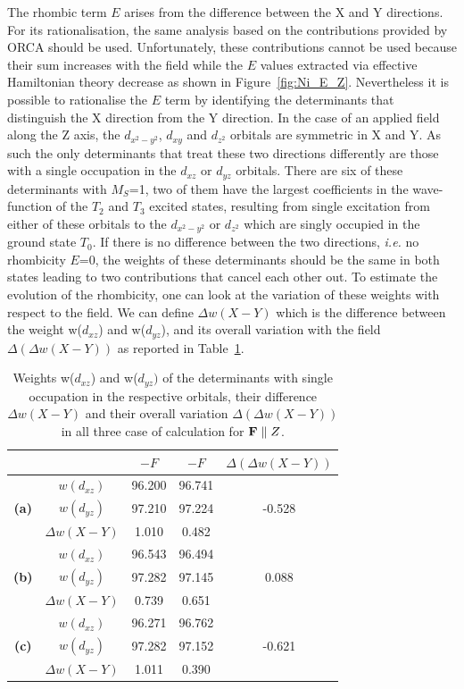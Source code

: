 \documentclass[12pt,a4paper]{report}
\numberwithin{equation}{section}
\begin{document}
The rhombic term $E$ arises from the difference between the X and Y directions. For its rationalisation, the same analysis based on the contributions provided by ORCA should be used.
Unfortunately, these contributions cannot be used because their sum increases with the field while the $E$ values extracted via effective Hamiltonian theory decrease as shown in Figure~\ref{fig:Ni_E_Z}.
Nevertheless it is possible to rationalise the $E$ term by identifying the determinants that distinguish the X direction from the Y direction. 
In the case of an applied field along the Z axis, the $d_{x^2-y^2}$, $d_{xy}$ and $d_{z^2}$ orbitals are symmetric in X and Y. As such the only determinants that treat these two directions differently are those with a single occupation in the $d_{xz}$ or $d_{yz}$ orbitals.
There are six of these determinants with $M_S$=1, two of them have the largest coefficients in the wave-function of the $T_2$ and $T_3$ excited states, resulting from single excitation from either of these orbitals to the $d_{x^2-y^2}$ or $d_{z^2}$ which are singly occupied in the ground state $T_0$.
If there is no difference between the two directions, \textit{i.e.} no rhombicity $E$=0, the weights of these determinants should be the same in both states leading to two contributions that cancel each other out. 
To estimate the evolution of the rhombicity, one can look at the variation of these weights with respect to the field.
We can define $\Delta w(X-Y)$ which is the difference between the weight w($d_{xz}$) and w($d_{yz}$), and its overall variation with the field $\Delta (\Delta w(X-Y))$ as reported in Table~\ref{tab:PoidsZ}.

\begin{table}[H]
    \centering
    \begin{tabular}{c | c | c c | c }
        & &  $-F$ & $-F$ & $\Delta (\Delta w(X-Y))$\\
        \hline
        \multirow{3}{*}{\textbf{(a)}}
        &$w(d_{xz})$ &  96.200 & 96.741 & \\
        &$w(d_{yz})$ &  97.210 & 97.224 & -0.528\\
        &$\Delta w(X-Y)$ & 1.010 & 0.482& \\
        \hline
        \multirow{3}{*}{\textbf{(b)}}
        &$w(d_{xz})$ &  96.543 & 96.494 & \\
        &$w(d_{yz})$ &  97.282 & 97.145 & 0.088\\
        &$\Delta w(X-Y)$ & 0.739 & 0.651& \\
        \hline
        \multirow{3}{*}{\textbf{(c)}}
        &$w(d_{xz})$ &  96.271 & 96.762 & \\
        &$w(d_{yz})$ &  97.282 & 97.152 & -0.621\\
        &$\Delta w(X-Y)$ & 1.011 & 0.390& \\
        \hline
    \end{tabular}
    \caption{Weights w($d_{xz}$) and w($d_{yz})$ of the determinants with single occupation in the respective orbitals, their difference $\Delta w(X-Y)$ and their overall variation $\Delta (\Delta w(X-Y))$ in all three case of calculation for $\vb{F}\parallel Z$. }
    \label{tab:PoidsZ}
\end{table}
\end{document}

